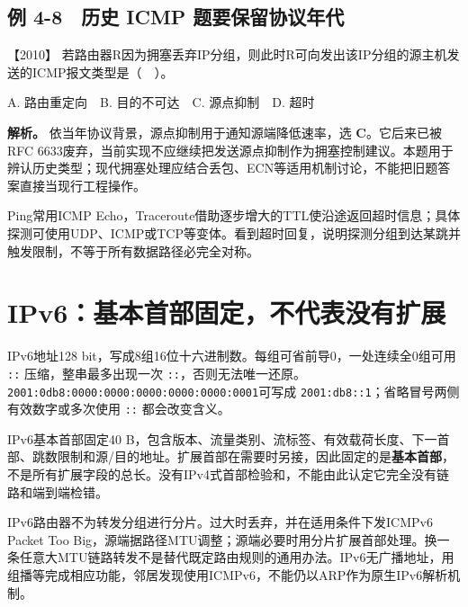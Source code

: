 \subsection{例 4-8　历史 ICMP 题要保留协议年代}\label{cn-ex4-8}

\noindent{}【2010】 若路由器R因为拥塞丢弃IP分组，则此时R可向发出该IP分组的源主机发送的ICMP报文类型是（　）。

A. 路由重定向　B. 目的不可达　C. 源点抑制　D. 超时


\textbf{解析。} 依当年协议背景，源点抑制用于通知源端降低速率，选 \textbf{C}。它后来已被RFC 6633废弃，当前实现不应继续把发送源点抑制作为拥塞控制建议。本题用于辨认历史类型；现代拥塞处理应结合丢包、ECN等适用机制讨论，不能把旧题答案直接当现行工程操作。

Ping常用ICMP Echo，Traceroute借助逐步增大的TTL使沿途返回超时信息；具体探测可使用UDP、ICMP或TCP等变体。看到超时回复，说明探测分组到达某跳并触发限制，不等于所有数据路径必完全对称。

\section{IPv6：基本首部固定，不代表没有扩展}\label{cn-04-14}

IPv6地址128 bit，写成8组16位十六进制数。每组可省前导0，一处连续全0组可用 \allowbreak{}\texttt{::} 压缩，整串最多出现一次 \allowbreak{}\texttt{::}，否则无法唯一还原。\allowbreak{}\texttt{2001:0db8:0000:0000:0000:0000:0000:0001}可写成 \allowbreak{}\texttt{2001:db8::1}；省略冒号两侧有效数字或多次使用 \allowbreak{}\texttt{::} 都会改变含义。

IPv6基本首部固定40 B，包含版本、流量类别、流标签、有效载荷长度、下一首部、跳数限制和源/目的地址。扩展首部在需要时另接，因此固定的是\textbf{基本首部}，不是所有扩展字段的总长。没有IPv4式首部检验和，不能由此认定它完全没有链路和端到端检错。

IPv6路由器不为转发分组进行分片。过大时丢弃，并在适用条件下发ICMPv6 Packet Too Big，源端据路径MTU调整；源端必要时用分片扩展首部处理。换一条任意大MTU链路转发不是替代既定路由规则的通用办法。IPv6无广播地址，用组播等完成相应功能，邻居发现使用ICMPv6，不能仍以ARP作为原生IPv6解析机制。

